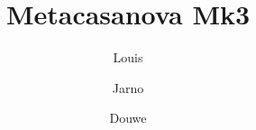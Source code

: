\documentclass[xetex]{beamer}
\title{Metacasanova Mk3}
\author{Louis \and Jarno \and Douwe}
\begin{document}
    \frame{\titlepage}

    
    
    
    
\end{document}
